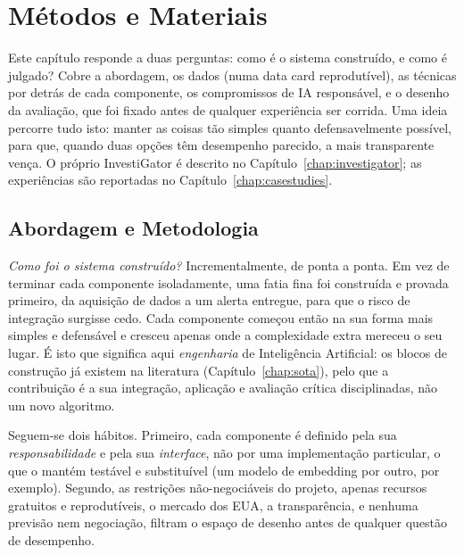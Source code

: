 
\chapter{Métodos e Materiais}
\label{chap:methods}

Este capítulo responde a duas perguntas: como é o sistema construído, e como é julgado? Cobre a abordagem,
os dados (numa data card reprodutível), as técnicas por detrás de cada componente, os compromissos de
IA responsável, e o desenho da avaliação, que foi fixado antes de qualquer experiência ser corrida. Uma
ideia percorre tudo isto: manter as coisas tão simples quanto defensavelmente possível, para que, quando
duas opções têm desempenho parecido, a mais transparente vença. O próprio InvestiGator é descrito no
Capítulo~\ref{chap:investigator}; as experiências são reportadas no Capítulo~\ref{chap:casestudies}.

\section{Abordagem e Metodologia}
\label{sec:met_approach}

\emph{Como foi o sistema construído?} Incrementalmente, de ponta a ponta. Em vez de terminar cada
componente isoladamente, uma fatia fina foi construída e provada primeiro, da aquisição de dados a um
alerta entregue, para que o risco de integração surgisse cedo. Cada componente começou então na sua forma
mais simples e defensável e cresceu apenas onde a complexidade extra mereceu o seu lugar. É isto que
significa aqui \emph{engenharia} de Inteligência Artificial: os blocos de construção já existem na
literatura (Capítulo~\ref{chap:sota}), pelo que a contribuição é a sua integração, aplicação e avaliação
crítica disciplinadas, não um novo algoritmo.

Seguem-se dois hábitos. Primeiro, cada componente é definido pela sua \emph{responsabilidade} e pela sua
\emph{interface}, não por uma implementação particular, o que o mantém testável e substituível (um modelo de
embedding por outro, por exemplo). Segundo, as restrições não-negociáveis do projeto, apenas recursos
gratuitos e reprodutíveis, o mercado dos EUA, a transparência, e nenhuma previsão nem negociação, filtram o
espaço de desenho antes de qualquer questão de desempenho.

